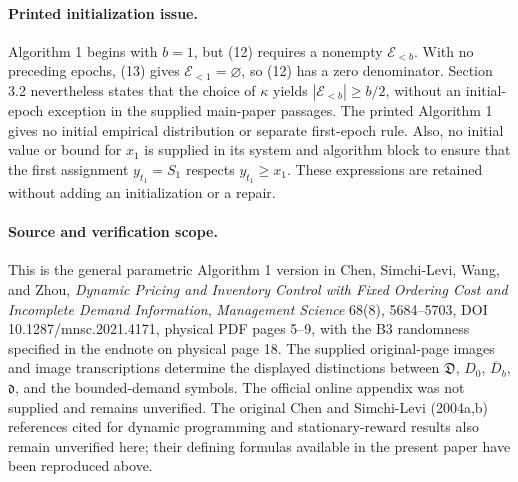 \documentclass[11pt]{article}
\begin{document}
\paragraph{Printed initialization issue.}
Algorithm 1 begins with \(b=1\), but (12) requires a nonempty \(\mathcal E_{<b}\). With no preceding epochs, (13) gives \(\mathcal E_{<1}=\varnothing\), so (12) has a zero denominator. Section 3.2 nevertheless states that the choice of \(\kappa\) yields \(|\mathcal E_{<b}|\geq b/2\), without an initial-epoch exception in the supplied main-paper passages. The printed Algorithm 1 gives no initial empirical distribution or separate first-epoch rule. Also, no initial value or bound for \(x_1\) is supplied in its system and algorithm block to ensure that the first assignment \(y_{t_1}=S_1\) respects \(y_{t_1}\geq x_1\). These expressions are retained without adding an initialization or a repair.

\paragraph{Source and verification scope.}
This is the general parametric Algorithm 1 version in Chen, Simchi-Levi, Wang, and Zhou, \emph{Dynamic Pricing and Inventory Control with Fixed Ordering Cost and Incomplete Demand Information}, \emph{Management Science} 68(8), 5684--5703, DOI 10.1287/mnsc.2021.4171, physical PDF pages 5--9, with the B3 randomness specified in the endnote on physical page 18. The supplied original-page images and image transcriptions determine the displayed distinctions between \(\mathfrak D\), \(D_0\), \(\overline D_b\), \(\mathfrak d\), and the bounded-demand symbols. The official online appendix was not supplied and remains unverified. The original Chen and Simchi-Levi (2004a,b) references cited for dynamic programming and stationary-reward results also remain unverified here; their defining formulas available in the present paper have been reproduced above.
\end{document}
